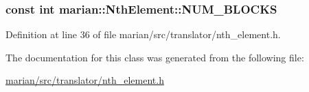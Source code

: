 \subsubsection[{\texorpdfstring{N\+U\+M\+\_\+\+B\+L\+O\+C\+KS}{NUM_BLOCKS}}]{\setlength{\rightskip}{0pt plus 5cm}const int marian\+::\+Nth\+Element\+::\+N\+U\+M\+\_\+\+B\+L\+O\+C\+KS\hspace{0.3cm}{\ttfamily [private]}}\hypertarget{classmarian_1_1NthElement_a813081a72cbe6e9d25e2cf8a964d23be}{}\label{classmarian_1_1NthElement_a813081a72cbe6e9d25e2cf8a964d23be}


Definition at line 36 of file marian/src/translator/nth\+\_\+element.\+h.



The documentation for this class was generated from the following file\+:\begin{DoxyCompactItemize}
\item 
\hyperlink{marian_2src_2translator_2nth__element_8h}{marian/src/translator/nth\+\_\+element.\+h}\end{DoxyCompactItemize}
